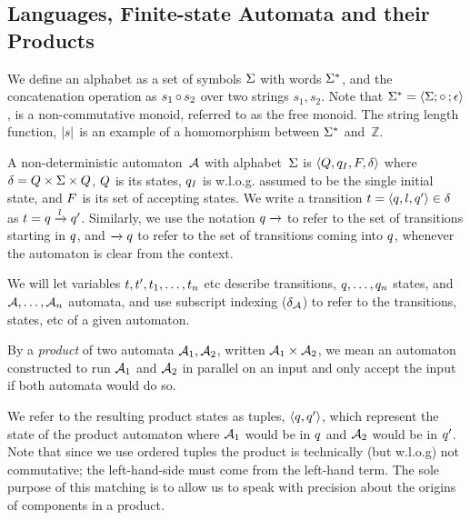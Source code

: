 \documentclass[acmsmall,review,anonymous,screen]{acmart}\settopmatter{printfolios=true,printccs=false,printacmref=true}
\theoremstyle{definition}
\begin{document}
\subsection{Languages, Finite-state Automata and their Products}

We define an alphabet as a set of symbols $\Sigma$ with words $\Sigma^*$, and
the concatenation operation as $s_1 \operatorname{\circ}{} s_2$ over two strings $s_1, s_2$.
Note that $\Sigma^* = \left\langle\Sigma;\operatorname{\circ}{};\epsilon\right\rangle$, is a
non-commutative monoid, referred to as the free monoid. The string length
function, $|s|$ is an example of a homomorphism between $\Sigma^*$
and~$\mathbb{Z}$.

A non-deterministic automaton~$\mathcal{A}$ with alphabet~$\Sigma$ is
$\left\langle Q, q_I, F, \delta\right\rangle$ where $\delta = Q \times \Sigma \times
Q$, $Q$ is its states, $q_I$ is w.l.o.g. assumed to be the
single initial state, and $F$ is its set of accepting states.  We
write a transition $t = \left\langle q, l, q'\right\rangle \in
\delta$ as $t = q \xrightarrow{l} q'$.
Similarly, we use the notation $q \xrightarrow{}$ to refer to the set of
transitions starting in $q$, and $\xrightarrow{} q$ to refer to the
set of transitions coming into $q$, whenever the automaton is clear from
the context.

We will let variables $t, t', t_1, \ldots,
t_n$ etc describe transitions, $q, \ldots, q_n$ states, and
$\mathcal{A}, \ldots, \mathcal{A}_n$ automata, and use subscript indexing
($\delta_{\mathcal{A}}$) to refer to the transitions, states, etc of a given
automaton.

By a \emph{product} of two automata $\mathcal{A}_1, \mathcal{A}_2$, written
$\mathcal{A}_1 \times \mathcal{A}_2$, we mean an automaton constructed to run
$\mathcal{A}_1$ and $\mathcal{A}_2$ in parallel on an input and only accept the
input if both automata would do so.

We refer to the resulting product states as tuples, $\left\langle q, q'\right\rangle$,
which represent the state of the product automaton where $\mathcal{A}_1$ would be
in $q$ and $\mathcal{A}_2$ would be in $q'$. Note that since we use
ordered tuples the product is technically (but w.l.o.g) not commutative; the
left-hand-side must come from the left-hand term. The sole purpose of this
matching is to allow us to speak with precision about the origins of components
in a product.
\end{document}
